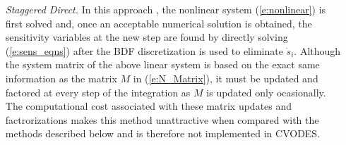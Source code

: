 \begin{itemize}

\item[{\em Staggered Direct.}]
  In this approach \cite{CaSt:85}, the nonlinear system (\ref{e:nonlinear}) is first 
  solved and, once an acceptable numerical solution is obtained, the sensitivity 
  variables at the new step are found by directly solving (\ref{e:sens_eqns}) 
  after the BDF discretization is used to eliminate ${\dot s}_i$. 
  Although the system matrix of the above linear system is based on the exact same 
  information as the matrix $M$ in (\ref{e:N_Matrix}), it must be updated and factored 
  at every step of the integration as $M$ is updated only ocasionally. 
  The computational cost associated with these matrix updates and factrorizations 
  makes this method unattractive when compared with the methods described below and 
  is therefore not implemented in CVODES.
  

\end{itemize}
